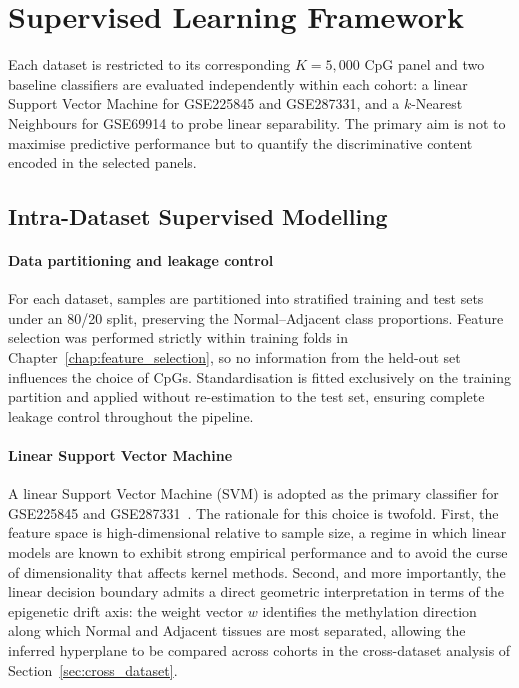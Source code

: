 \section{Supervised Learning Framework}

Each dataset is restricted to its corresponding $K = 5{,}000$
CpG panel and two baseline classifiers are evaluated
independently within each cohort: a linear Support Vector
Machine for GSE225845 and GSE287331, and a $k$-Nearest
Neighbours for GSE69914 to probe linear separability.
The primary aim is not to maximise predictive performance
but to quantify the discriminative content encoded in the
selected panels.


\subsection{Intra-Dataset Supervised Modelling}
\label{sec:intra_modelling}

\paragraph{Data partitioning and leakage control}

For each dataset, samples are partitioned into stratified
training and test sets under an 80/20 split, preserving the
Normal--Adjacent class proportions. Feature selection was
performed strictly within training folds in
Chapter~\ref{chap:feature_selection}, so no information from
the held-out set influences the choice of CpGs. Standardisation
is fitted exclusively on the training partition and applied
without re-estimation to the test set, ensuring complete
leakage control throughout the pipeline.

\paragraph{Linear Support Vector Machine}

A linear Support Vector Machine (SVM) is adopted as the
primary classifier for GSE225845 and
GSE287331~\cite{cortes1995svm}. The rationale for this choice
is twofold. First, the feature space is high-dimensional
relative to sample size, a regime in which linear models are
known to exhibit strong empirical performance and to avoid the
curse of dimensionality that affects kernel methods. Second,
and more importantly, the linear decision boundary admits a
direct geometric interpretation in terms of the epigenetic
drift axis: the weight vector $w$ identifies the methylation
direction along which Normal and Adjacent tissues are most
separated, allowing the inferred hyperplane to be compared
across cohorts in the cross-dataset analysis of
Section~\ref{sec:cross_dataset}.

